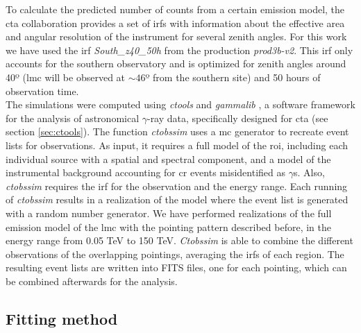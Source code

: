 \documentclass[main.tex]{subfiles}
\begin{document}
To calculate the predicted number of counts from a certain emission model, the \gls{cta} collaboration provides a set of \glspl{irf} \cite{CTAPerformance} with information about the effective area and angular resolution of the instrument for several zenith angles. For this work we have used the \gls{irf} \textit{South\_z40\_50h} from the production \textit{prod3b-v2}. This \gls{irf} only accounts for the southern observatory and is optimized for zenith angles around 40º (\gls{lmc} will be observed at $\sim 46$º from the southern site) and 50 hours of observation time. \\
The simulations were computed using \textit{ctools} and \textit{gammalib} \cite{2016Actools}, a software framework for the analysis of astronomical $\gamma$-ray data, specifically designed for \gls{cta} (see section \ref{sec:ctools}). The function \textit{ctobssim} uses a \gls{mc} generator to recreate event lists for observations. As input, it requires a full model of the \gls{roi}, including each individual source with a spatial and spectral component, and a model of the instrumental background accounting for \gls{cr} events misidentified as $\gamma$s.
Also, \textit{ctobssim} requires the \gls{irf} for the observation and the energy range. Each running of \textit{ctobssim} results in a realization of the model where the event list is generated with a random number generator. We have performed realizations of the full emission model of the \gls{lmc} with the pointing pattern described before, in the energy range from 0.05 TeV to 150 TeV. \textit{Ctobssim} is able to combine the different observations of the overlapping pointings, averaging the \glspl{irf} of each region. The resulting event lists are written into FITS files, one for each pointing, which can be combined afterwards for the analysis.\\

\subsection{Fitting method}
\end{document}
